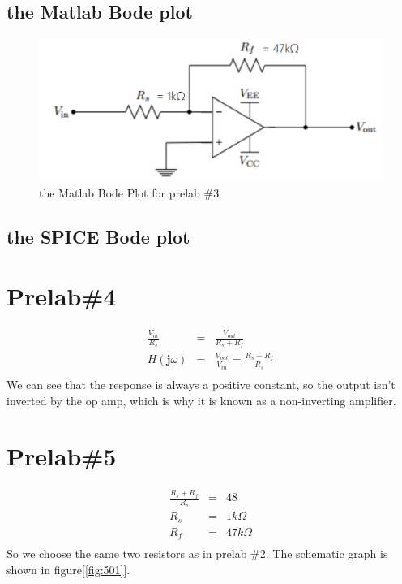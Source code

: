 \documentclass{IEEEtran}
\begin{document}
	\subsection{the Matlab Bode plot}
	\begin{figure}[!htbp]
		\centering
		\begin{framed}
			\includegraphics[width=\linewidth]{images/2_1.PNG}
			\caption{the Matlab Bode Plot for prelab \#3}
			\label{fig:301}
		\end{framed}
	\end{figure}
	\subsection{the SPICE Bode plot}
	
	\section{\textbf{Prelab\#4}}
	\begin{eqnarray*}
		\frac{V_{in}}{R_s} & = & \frac{V_{out}}{R_s + R_f}\\
		H(\mathbf{j}\omega) & = & \frac{V_{out}}{V_{in}} = \frac{R_s+R_f}{R_s}\\
	\end{eqnarray*}
	We can see that the response is always a positive constant, so the output isn't inverted by the op amp, which is why it is known as a non-inverting amplifier.
	
	\section{\textbf{Prelab\#5}}
	\begin{eqnarray*}
		\frac{R_s+R_f}{R_s} & = & 48\\
		R_s & = & 1\si{k\Omega}\\
		R_f & = & 47\si{k\Omega}\\
	\end{eqnarray*}
	So we choose the same two resistors as in prelab \#2. The schematic graph is shown in figure[\ref{fig:501}].
	
\end{document}
